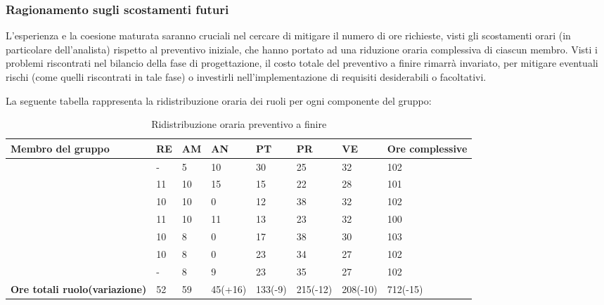 \subsubsection{Ragionamento sugli scostamenti futuri}
L'esperienza e la coesione maturata saranno cruciali nel cercare di mitigare il numero di ore richieste, visti gli scostamenti orari (in particolare dell'analista) rispetto al preventivo iniziale, che hanno portato ad una riduzione oraria complessiva di ciascun membro.
Visti i problemi riscontrati nel bilancio della fase di progettazione, il costo totale del preventivo a finire rimarrà invariato, per mitigare eventuali rischi (come quelli riscontrati in tale fase) o investirli nell'implementazione di requisiti desiderabili o facoltativi.



La seguente tabella rappresenta la ridistribuzione oraria dei ruoli per ogni componente del gruppo:
\renewcommand{\arraystretch}{2}
\begin{longtable}[h!] { C{3.5cm} C{1cm} C{1cm} C{1cm} C{1cm} C{1cm} C{1cm} C{2cm}}
\caption{Ridistribuzione oraria preventivo a finire}\\
\rowcolor{\primaryColor}

\textcolor{\secondaryColor}{\textbf{Membro del gruppo}} & 
\textcolor{\secondaryColor}{\textbf{RE}} & 
\textcolor{\secondaryColor}{\textbf{AM}} & 
\textcolor{\secondaryColor}{\textbf{AN}} & 
\textcolor{\secondaryColor}{\textbf{PT}} & 
\textcolor{\secondaryColor}{\textbf{PR}} & 
\textcolor{\secondaryColor}{\textbf{VE}} & 
\textcolor{\secondaryColor}{\textbf{Ore complessive}}\\	
\endhead
        
\AW{}                     & -  & 5 & 10 & 30 & 25 & 32 & 102 \\
\AT{}                     & 11 & 10 & 15& 15 & 22 & 28 & 101\\
\AD{}                     & 10 & 10 & 0 & 12 & 38 & 32 & 102 \\
\EC{}                     & 11 & 10 & 11& 13 & 23 & 32 & 100 \\
\EM{}                     & 10 & 8 & 0 & 17 & 38 & 30 & 103 \\
\FP{}                     & 10 & 8 & 0 & 23 & 34 & 27 & 102 \\
\GG{}                     & -  & 8 & 9 & 23 & 35 & 27 & 102 \\
\textbf{Ore totali ruolo(variazione)} & 52 & 59 & 45(+16) & 133(-9) & 215(-12) & 208(-10) & 712(-15) \\


\end{longtable}

